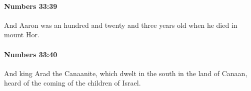 		\paragraph{Numbers 33:39} %
			\label{NUMBERS-33-39}

			And Aaron was an hundred and twenty and three years old when he died in mount Hor.


		\paragraph{Numbers 33:40} %
			\label{NUMBERS-33-40}

			And king Arad the Canaanite, which dwelt in the south in the land of Canaan, heard of the coming of the children of Israel.


